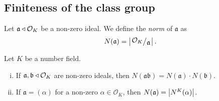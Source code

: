\newpage

\subsection{Finiteness of the class group}

\begin{definicija}
Let $\mathfrak{a} \triangleleft \mathcal{O}_K$ be a non-zero ideal. We
define the \emph{norm} of $\mathfrak{a}$ as
\[
N(\mathfrak{a}) = \abs{\kvoc{\mathcal{O}_K}{\mathfrak{a}}}.
\]
\end{definicija}

\begin{trditev}
Let $K$ be a number field.

\begin{enumerate}[i)]
\item If $\mathfrak{a}, \mathfrak{b} \triangleleft \mathcal{O}_K$ are
non-zero ideals, then
$N(\mathfrak{ab}) = N(\mathfrak{a}) \cdot N(\mathfrak{b})$.
\item If $\mathfrak{a} = (\alpha)$ for a non-zero
$\alpha \in \mathcal{O}_K$, then
$N(\mathfrak{a}) = \left\lvert N^K(\alpha)\right\rvert$.
\end{enumerate}
\end{trditev}


